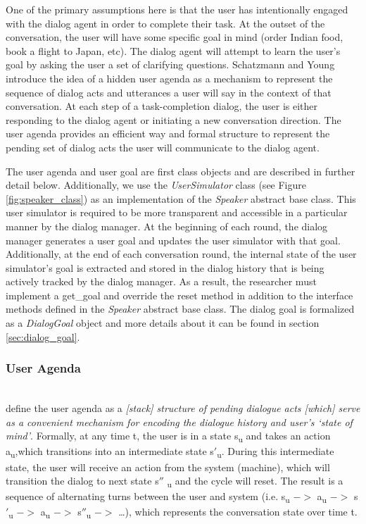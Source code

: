 One of the primary assumptions here is that the user has intentionally engaged with the dialog agent in order to complete their task. At the outset of the conversation, the user will have some specific goal in mind (order Indian food, book a flight to Japan, etc). The dialog agent will attempt to learn the user's goal by asking the user a set of clarifying questions. Schatzmann and Young introduce the idea of a hidden user agenda as a mechanism to represent the sequence of dialog acts and utterances a user will say in the context of that conversation. At each step of a task-completion dialog, the user is either responding to the dialog agent or initiating a new conversation direction. The user agenda provides an efficient way and formal structure to represent the pending set of dialog acts the user will communicate to the dialog agent.

The user agenda and user goal are first class objects and are described in further detail below. Additionally, we use the \textit{UserSimulator} class (see Figure \ref{fig:speaker_class}) as an implementation of the \textit{Speaker} abstract base class. This user simulator is required to be more transparent and accessible in a particular manner by the dialog manager. At the beginning of each round, the dialog manager generates a user goal and updates the user simulator with that goal. Additionally, at the end of each conversation round, the internal state of the user simulator's goal is extracted and stored in the dialog history that is being actively tracked by the dialog manager. As a result, the researcher must implement a get\_goal and override the reset method in addition to the interface methods defined in the \textit{Speaker} abstract base class. The dialog goal is formalized as a \textit{DialogGoal} object and more details about it can be found in section \ref{sec:dialog_goal}. 

\subsubsection{User Agenda} 
~ \\
\cite{Schatzmann2009TheHA} define the user agenda as a \textit{[stack] structure of pending dialogue acts [which] serve as a convenient mechanism for encoding the dialogue history and user’s ‘state of mind’}. Formally, at any time t, the user is in a state s\textsubscript{u} and takes an action a\textsubscript{u},which transitions into an intermediate state s$'$\textsubscript{u}. During this intermediate state, the user will receive an action from the system (machine), which will transition the dialog to next state s$''$ \textsubscript{u} and the cycle will reset. The result is a sequence of alternating turns between the user and system (i.e. s\textsubscript{u} $->$ a\textsubscript{u} $->$ s$'$\textsubscript{u} $->$ a\textsubscript{u} $->$ s$''$\textsubscript{u} $->$ \dots), which represents the conversation state over time t.

